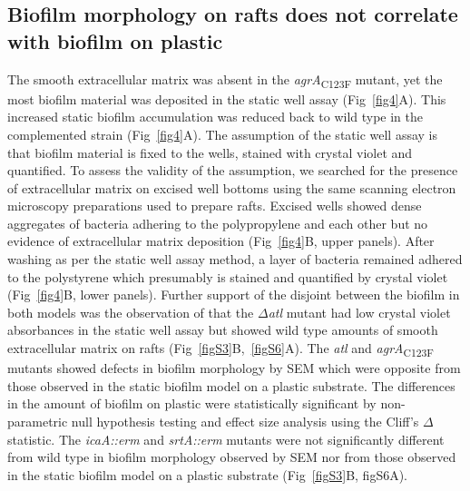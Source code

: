 \documentclass[10pt,letterpaper]{article}
\begin{document}
\subsection*{Biofilm morphology on rafts does not correlate with biofilm on plastic}

The smooth extracellular matrix was absent in the \textit{agrA}\textsubscript{C123F} mutant, yet the most biofilm material was deposited in the static well assay (Fig~\ref{fig4}A).
This increased static biofilm accumulation was reduced back to wild type in the complemented strain (Fig~\ref{fig4}A).
The assumption of the static well assay is that biofilm material is fixed to the wells, stained with crystal violet and quantified.
To assess the validity of the assumption, we searched for the presence of extracellular matrix on excised well bottoms using the same scanning electron microscopy preparations used to prepare rafts.
Excised wells showed dense aggregates of bacteria adhering to the polypropylene and each other but no evidence of extracellular matrix deposition (Fig~\ref{fig4}B, upper panels).
After washing as per the static well assay method, a layer of bacteria remained adhered to the polystyrene which presumably is stained and quantified by crystal violet (Fig~\ref{fig4}B, lower panels).
Further support of the disjoint between the biofilm in both models was the observation of that the $\Delta$\textit{atl} mutant had low crystal violet absorbances in the static well assay but showed wild type amounts of smooth extracellular matrix on rafts (Fig~\ref{figS3}B,~\ref{figS6}A).
The \textit{atl} and \textit{agrA}\textsubscript{C123F} mutants showed defects in biofilm morphology by SEM which were opposite from those observed in the static biofilm model on a plastic substrate.
The differences in the amount of biofilm on plastic were statistically significant by non-parametric null hypothesis testing and effect size analysis using the Cliff's $\Delta$ statistic.
The \textit{icaA::erm} and \textit{srtA::erm} mutants were not significantly different from wild type in biofilm morphology observed by SEM nor from those observed in the static biofilm model on a plastic substrate (Fig~\ref{figS3}B, {figS6}A).
\end{document}
